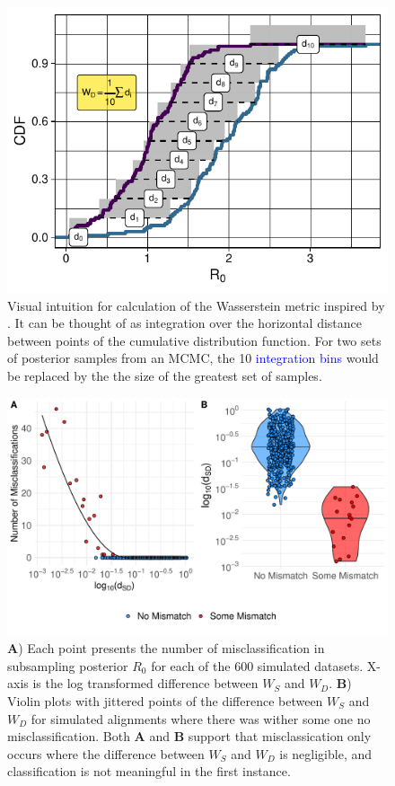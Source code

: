\documentclass{article}
\begin{document}
\begin{figure}[H]
\centering
\includegraphics[width=0.5\linewidth]{../figures/wassersteinIntuition.pdf}
\caption{Visual intuition for calculation of the Wasserstein metric inspired by \citet{kolouri_generalized_2019}. It can be thought of as integration over the horizontal distance between points of the cumulative distribution function. For two sets of posterior samples from an MCMC, the 10 \textcolor{blue}{integration bins} would be replaced by the the size of the greatest set of samples.}
\label{fig:wassIntuition}
\end{figure}

\begin{figure}[H]
\centering
\includegraphics[width=1\linewidth]{../figures/errorWasserstein.pdf}
\caption{ \textbf{A}) Each point presents the number of misclassification in subsampling posterior $R_0$ for each of the 600 simulated datasets. X-axis is the log transformed difference between $W_S$ and $W_D$. \textbf{B}) Violin plots with jittered points of the difference between $W_S$ and $W_D$ for simulated alignments where there was wither some one no misclassification. Both \textbf{A} and \textbf{B} support that misclassication only occurs where the difference between $W_S$ and $W_D$ is negligible, and classification is not meaningful in the first instance.}
\label{fig:validateW}
\end{figure}
\end{document}
